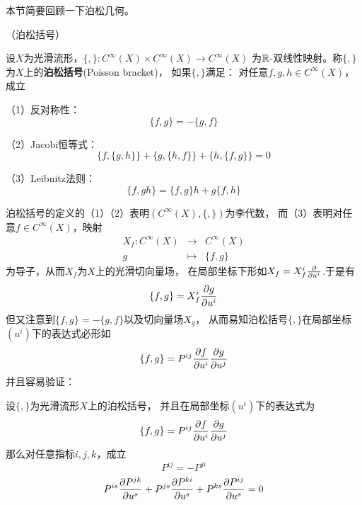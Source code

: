 本节简要回顾一下泊松几何。

\begin{definition}（泊松括号）

设$X$为光滑流形，$\{,\}:C^{\infty}(X)\times C^{\infty}(X)\to C^{\infty}(X)$
为$\mathbb{R}$-双线性映射。称$\{,\}$为$X$上的\textbf{泊松括号}(Poisson bracket)，
如果$\{,\}$满足：
对任意$f,g,h\in C^{\infty}(X)$，成立

（1）反对称性：$$\{f,g\}=-\{g,f\}$$

（2）Jacobi恒等式：
$$\{f,\{g,h\}\}+\{g,\{h,f\}\}+\{h,\{f,g\}\}=0$$

（3）Leibnitz法则：
$$\{f,gh\}=\{f,g\}h+g\{f,h\}$$
\end{definition}


泊松括号的定义的（1）（2）表明$(C^{\infty}(X),\{,\})$为李代数，
而（3）表明对任意$f\in C^{\infty}(X)$，映射
\begin{eqnarray*}
X_f:C^{\infty}(X)&\to& C^{\infty}(X)\\
g &\mapsto& \{f,g\}
\end{eqnarray*}
为导子，从而$X_f$为$X$上的光滑切向量场，
在局部坐标下形如$X_f=X_f^i\frac{\partial } {\partial u^i}$.于是有
$$\{f,g\}=X_f^i\frac{\partial g} {\partial u^i}$$
但又注意到$\{f,g\}=-\{g,f\}$以及切向量场$X_g$，
从而易知泊松括号$\{,\}$在局部坐标$(u^i)$下的表达式必形如
$$\{f,g\}=P^{ij}\frac{\partial f} {\partial u^i}\frac{\partial g} {\partial u^j}$$
并且容易验证：
\begin{lemma}设$\{,\}$为光滑流形$X$上的泊松括号，
并且在局部坐标$(u^i)$下的表达式为
$$\{f,g\}=P^{ij}\frac{\partial f} {\partial u^i}\frac{\partial g} {\partial u^j}$$
那么对任意指标$i,j,k$，成立
$$P^{ij}=-P^{ji}$$
$$P^{is}\frac{\partial P^{jk}} {\partial u^s}+
P^{js}\frac{\partial P^{ki}} {\partial u^s}+
P^{ks}\frac{\partial P^{ij}} {\partial u^s}=0$$
\end{lemma}

